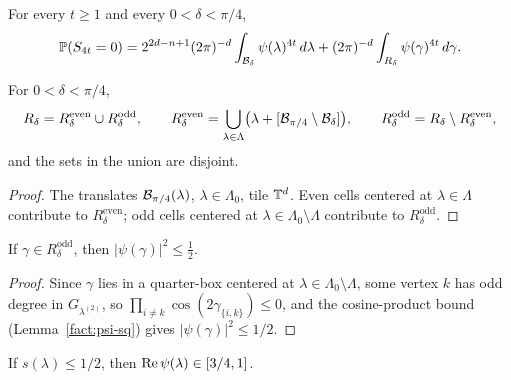 \begin{proposition}\label{prop:primary-secondary}
\leanok
{}
For every $t\ge 1$ and every $0<\delta<\pi/4$,
\[
  \mathbb{P}(S_{4t}=0)
  =
  2^{2d-n+1}(2\pi)^{-d}\int_{\mathcal{B}_\delta}\psi(\lambda)^{4t}\,d\lambda
  +(2\pi)^{-d}\int_{R_\delta}\psi(\gamma)^{4t}\,d\gamma.
\]
\end{proposition}

\begin{lemma}\label{lem:residual-decomp}
\leanok
{}
For $0<\delta<\pi/4$,
\[
  R_\delta = R_\delta^{\mathrm{even}} \cup R_\delta^{\mathrm{odd}},
  \qquad
  R_\delta^{\mathrm{even}}
  = \bigcup_{\lambda\in\Lambda}\bigl(\lambda+[\mathcal{B}_{\pi/4}\setminus\mathcal{B}_\delta]\bigr),
  \qquad
  R_\delta^{\mathrm{odd}}
  = R_\delta\setminus R_\delta^{\mathrm{even}},
\]
and the sets in the union are disjoint.
\end{lemma}

\begin{proof}\leanok
{}
The translates $\mathcal{B}_{\pi/4}(\lambda)$, $\lambda\in\Lambda_0$, tile $\mathbb{T}^d$.
Even cells centered at $\lambda\in\Lambda$ contribute to $R_\delta^{\mathrm{even}}$;
odd cells centered at $\lambda\in\Lambda_0\setminus\Lambda$ contribute to
$R_\delta^{\mathrm{odd}}$.
\end{proof}

\begin{lemma}\label{lem:odd-bound}
\leanok
{}
If $\gamma\in R_\delta^{\mathrm{odd}}$, then $|\psi(\gamma)|^2\le \tfrac12$.
\end{lemma}

\begin{proof}\leanok
{}
Since $\gamma$ lies in a quarter-box centered at $\lambda\in\Lambda_0\setminus\Lambda$,
some vertex $k$ has odd degree in $G_{\lambda^{(2)}}$,
so $\prod_{i\ne k}\cos(2\gamma_{\{i,k\}})\le 0$,
and the cosine-product bound (Lemma~\ref{fact:psi-sq}) gives
$|\psi(\gamma)|^2\le 1/2$.
\end{proof}

\begin{lemma}\label{lem:realpart}
\leanok
If $s(\lambda)\le 1/2$, then $\operatorname{Re}\psi(\lambda)\in[3/4,1]$.
\end{lemma}

